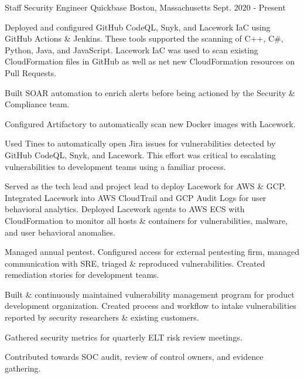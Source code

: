 

\begin{cventries}
\vspace{-3mm}
  \cventry
    {Staff Security Engineer} %
    {Quickbase} %
    {Boston, Massachusetts} %
    {Sept. 2020 - Present} %
    {
      \begin{cvitems} %
        \item {
          Deployed and configured GitHub CodeQL, Snyk, and Lacework IaC using GitHub Actions \& Jenkins. These tools supported the scanning of C++, C\#, Python, Java, and JavaScript. Lacework IaC was used to scan existing CloudFormation files in GitHub as well as net new CloudFormation resources on Pull Requests.
        }
        \item {
          Built SOAR automation to enrich alerts before being actioned by the Security \& Compliance team.
        }
        \item {
          Configured Artifactory to automatically scan new Docker images with Lacework.
        }
        \item {
          Used Tines to automatically open Jira issues for vulnerabilities detected by GitHub CodeQL, Snyk, and Lacework. This effort was critical to escalating vulnerabilities to development teams using a familiar process.
        }
        \item {
          Served as the tech lead and project lead to deploy Lacework for AWS \& GCP. Integrated Lacework into AWS CloudTrail and GCP Audit Logs for user behavioral analytics. Deployed Lacework agents to AWS ECS with CloudFormation to monitor all hosts \& containers for vulnerabilities, malware, and user behavioral anomalies.
        }
        \item {
          Managed annual pentest. Configured access for external pentesting firm, managed communication with SRE, triaged \& reproduced vulnerabilities. Created remediation stories for development teams.
        }
        \item {
          Built \& continuously maintained vulnerability management program for product development organization. Created process and workflow to intake vulnerabilities reported by security researchers \& existing customers.
        }
        \item {
          Gathered security metrics for quarterly ELT risk review meetings.
        }
        \item {
          Contributed towards SOC audit, review of control owners, and evidence gathering.
        }
      \end{cvitems}
    }


\end{cventries}
